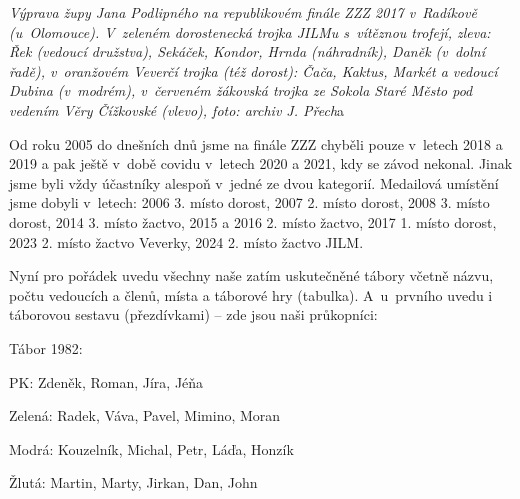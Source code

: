 \documentclass[a5paper, 11pt, twoside]{article}
\begin{document}
\textit{Výprava župy Jana Podlipného na republikovém finále ZZZ 2017
v~Radíkově (u~Olomouce). V~zeleném dorostenecká trojka JILMu s~vítěznou
trofejí, zleva: Řek (vedoucí družstva), Sekáček, Kondor, Hrnda
(náhradník), Daněk (v~dolní řadě), v~oranžovém Veverčí trojka (též
dorost): Čača, Kaktus, Markét a vedoucí Dubina (v~modrém), v~červeném
žákovská trojka ze Sokola Staré Město pod vedením Věry Čížkovské
(vlevo), foto: archiv J. Přech}a

Od roku 2005 do dnešních dnů jsme na finále ZZZ chyběli pouze v~letech
2018 a 2019 a pak ještě v~době covidu v~letech 2020 a 2021, kdy se závod
nekonal. Jinak jsme byli vždy účastníky alespoň v~jedné ze dvou
kategorií. Medailová umístění jsme dobyli v~letech: 2006 3. místo
dorost, 2007 2. místo dorost, 2008 3. místo dorost, 2014 3. místo
žactvo, 2015 a 2016 2. místo žactvo, 2017 1. místo dorost, 2023 2. místo
žactvo Veverky, 2024 2. místo žactvo JILM.

Nyní pro pořádek uvedu všechny naše zatím uskutečněné tábory včetně
názvu, počtu vedoucích a členů, místa a táborové hry (tabulka).
A~u~prvního uvedu i táborovou sestavu (přezdívkami) -- zde jsou naši
průkopníci:

Tábor 1982:

PK: Zdeněk, Roman, Jíra, Jéňa

Zelená: Radek, Váva, Pavel, Mimino, Moran

Modrá: Kouzelník, Michal, Petr, Láďa, Honzík

Žlutá: Martin, Marty, Jirkan, Dan, John
\end{document}
